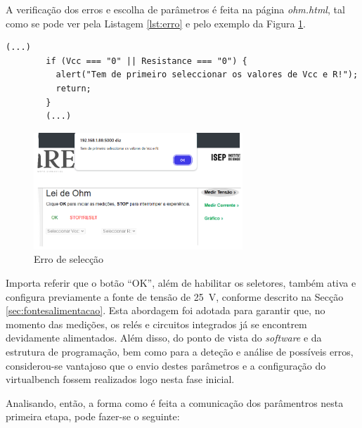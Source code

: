 A verificação dos erros e escolha de parâmetros é feita na página \textit{ohm.html}, tal como se pode ver pela Listagem \ref{lst:erro} e pelo exemplo da Figura \ref{fig:erropagina}.

\begin{center}
	\begin{minipage}{0.7\linewidth}
		\begin{lstlisting}[language=html, caption=Erro na página \textit{ohm.html}, label=lst:erro]
		(...)
        if (Vcc === "0" || Resistance === "0") {
          alert("Tem de primeiro seleccionar os valores de Vcc e R!");
          return;
        }
		(...)
	\end{lstlisting}
	\end{minipage}
\end{center}

\begin{figure}[hbtp]
	\centering
	\includegraphics[width=0.7\textwidth]{figures/erro_pagina.png}
	\caption{Erro de selecção}
	\label{fig:erropagina}
\end{figure}

Importa referir que o botão ``OK'', além de habilitar os seletores, também ativa e configura previamente a fonte de tensão de \SI{25}{\volt}, conforme descrito na Secção \ref{sec:fontesalimentacao}. Esta abordagem foi adotada para garantir que, no momento das medições, os relés e circuitos integrados já se encontrem devidamente alimentados. Além disso, do ponto de vista do \textit{software} e da estrutura de programação, bem como para a deteção e análise de possíveis erros, considerou-se vantajoso que o envio destes parâmetros e a configuração do \acrshort{virtualbench} fossem realizados logo nesta fase inicial.


Analisando, então, a forma como é feita a comunicação dos parâmentros nesta primeira etapa, pode fazer-se o seguinte: 


